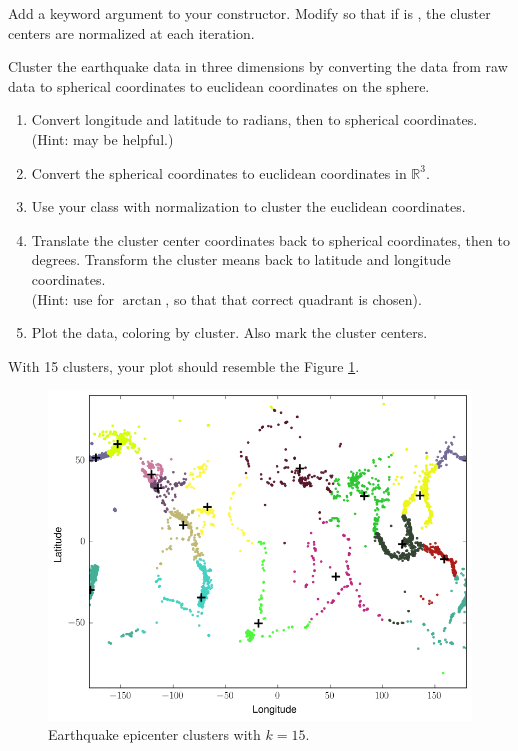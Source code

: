 \begin{problem}
Add a keyword argument  to your  constructor.
Modify  so that if  is , the cluster centers are normalized at each iteration.

Cluster the earthquake data in three dimensions by converting the data from raw data to spherical coordinates to euclidean coordinates on the sphere.
\begin{enumerate}
\item Convert longitude and latitude to radians, then to spherical coordinates.
\\(Hint:  may be helpful.)
\item Convert the spherical coordinates to euclidean coordinates in $\mathbb{R}^3$.
\item Use your  class with normalization to cluster the euclidean coordinates.
\item Translate the cluster center coordinates back to spherical coordinates, then to degrees.
Transform the cluster means back to latitude and longitude coordinates.
\\(Hint: use  for $\arctan$, so that that correct quadrant is chosen).
\item Plot the data, coloring by cluster.
Also mark the cluster centers.
\end{enumerate}
With 15 clusters, your plot should resemble the Figure \ref{fig:earthquakeclusters}.
\end{problem}

\begin{figure}[H]
    \centering
    \includegraphics[width=.7\textwidth]{figures/earthquake_clusters.png}
    \caption{Earthquake epicenter clusters with $k = 15$.}
    \label{fig:earthquakeclusters}
\end{figure}

